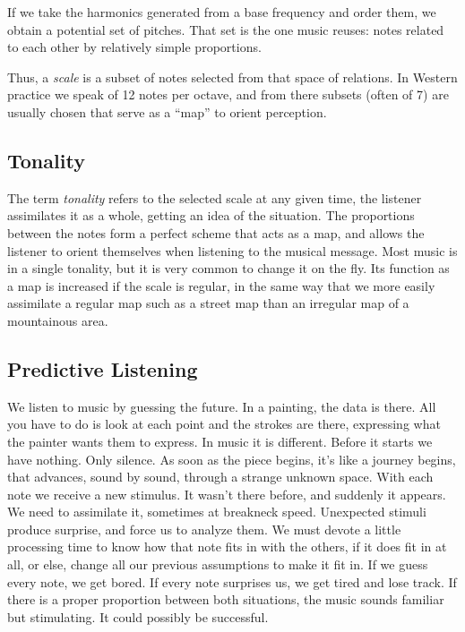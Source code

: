 \documentclass[]{report}
\begin{document}
If we take the harmonics generated from a base frequency and order them, we obtain a potential set of pitches. That set is the one music reuses: notes related to each other by relatively simple proportions.

Thus, a \emph{scale} is a subset of notes selected from that space of relations. In Western practice we speak of 12 notes per octave, and from there subsets (often of 7) are usually chosen that serve as a ``map'' to orient perception.

\subsection{Tonality}
The term \emph{tonality} refers to the selected scale at any given time, the listener assimilates it as a whole, getting an idea of the situation. The proportions between the notes form a perfect scheme that acts as a map, and allows the listener to orient themselves when listening to the musical message. Most music is in a single tonality, but it is very common to change it on the fly. Its function as a map is increased if the scale is regular, in the same way that we more easily assimilate a regular map such as a street map than an irregular map of a mountainous area.
\subsection{Predictive Listening}
We listen to music by guessing the future. In a painting, the data is there. All you have to do is look at each point and the strokes are there, expressing what the painter wants them to express. In music it is different. Before it starts we have nothing. Only silence. As soon as the piece begins, it's like a journey begins, that advances, sound by sound, through a strange unknown space.
With each note we receive a new stimulus. It wasn't there before, and suddenly it appears. We need to assimilate it, sometimes at breakneck speed.
Unexpected stimuli produce surprise, and force us to analyze them. We must devote a little processing time to know how that note fits in with the others, if it does fit in at all, or else, change all our previous assumptions to make it fit in. If we guess every note, we get bored. If every note surprises us, we get tired and lose track. If there is a proper proportion between both situations, the music sounds familiar but stimulating. It could possibly be successful.
\end{document}
